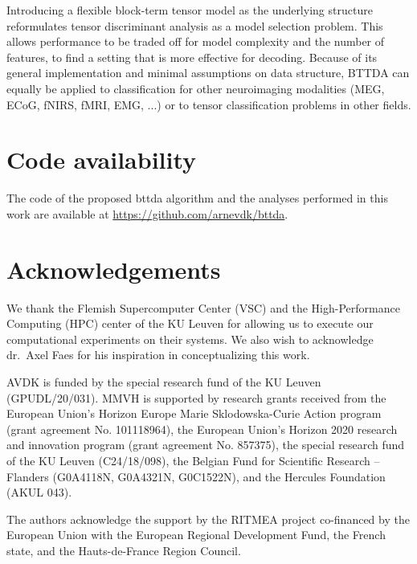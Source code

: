 \documentclass[10pt]{iopart}
\begin{document}
Introducing a flexible block-term tensor model as the underlying structure
reformulates tensor discriminant analysis as a model selection
problem.
This allows performance to be traded off for model complexity and the number of
features, to find a setting that is more effective for decoding.
Because of its general implementation and minimal assumptions on data structure,
BTTDA can equally be applied to classification for other neuroimaging modalities
(MEG, ECoG, fNIRS, fMRI, EMG, ...) or to tensor classification problems in other
fields.

\section*{Code availability}

The code of the proposed \ac{bttda} algorithm and the analyses performed in
this work are available at \url{https://github.com/arnevdk/bttda}.

\section*{Acknowledgements}
We thank the Flemish Supercomputer Center (VSC) and the High-Performance
Computing (HPC) center of the KU Leuven for allowing us to execute our
computational experiments on their systems.
We also wish to acknowledge dr.\ Axel Faes for his inspiration in conceptualizing this
work.

AVDK is funded by the special research fund of the KU Leuven (GPUDL/20/031).
MMVH is supported by research grants received from the European Union’s
Horizon Europe Marie Sklodowska-Curie Action program
(grant agreement No. 101118964), the European Union’s Horizon 2020 research and
innovation program (grant agreement No. 857375), the special research fund of
the KU Leuven (C24/18/098), the Belgian Fund for Scientific Research – Flanders
(G0A4118N, G0A4321N, G0C1522N), and the Hercules Foundation (AKUL 043).

The authors acknowledge the support by the RITMEA project co-financed by the
European Union with the European Regional Development Fund, the French state,
and the Hauts-de-France Region Council.

\printbibliography
\end{document}
